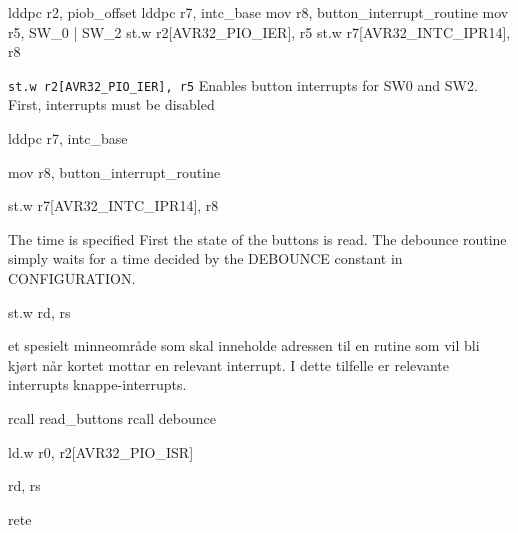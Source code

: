 lddpc r2, piob_offset
lddpc r7, intc_base
mov r8, button_interrupt_routine
mov r5, SW_0 | SW_2
st.w r2[AVR32_PIO_IER], r5 
st.w r7[AVR32_INTC_IPR14], r8

\texttt{st.w r2[AVR32_PIO_IER], r5}
Enables button interrupts for SW0 and SW2.
First, interrupts must be disabled


lddpc r7, intc_base

mov r8, button_interrupt_routine

st.w r7[AVR32_INTC_IPR14], r8

The time is specified 
First the state of the buttons is read.
The debounce routine simply waits for a time decided by the DEBOUNCE constant in CONFIGURATION.

st.w rd, rs


et spesielt minneområde som skal inneholde adressen til en rutine som vil bli kjørt når kortet mottar en relevant interrupt. I dette tilfelle er relevante interrupts knappe-interrupts.

rcall read_buttons
rcall debounce

ld.w r0, r2[AVR32_PIO_ISR]

rd, rs

rete
